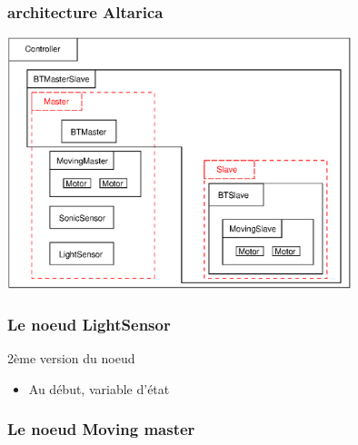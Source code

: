  \begin{frame}
  \frametitle{architecture Altarica}
  \center
  \includegraphics[width=10cm]{ARmodel.eps}

 \end{frame}
 
 
 \begin{frame}
  \frametitle{Le noeud LightSensor}

    \begin{block}{2ème version du noeud}
    
    \end{block}
    
    \begin{block}{}
    \begin{itemize}
      \item Au début, variable d'état
   \end{itemize}
  \end{block}

 \end{frame}
 
  \begin{frame}
  \frametitle{Le noeud Moving master}

    \begin{block}{}
    
    \end{block}

 \end{frame}
